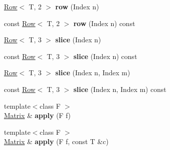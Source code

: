 \begin{DoxyCompactItemize}
\item 
\hyperlink{classcpt_1_1Row}{Row}$<$ T, 2 $>$ {\bfseries row} (Index n)\hypertarget{classcpt_1_1Matrix_3_01T_00_013_01_4_a712df7cee309914ac305c89775e1aace}{}\label{classcpt_1_1Matrix_3_01T_00_013_01_4_a712df7cee309914ac305c89775e1aace}

\item 
const \hyperlink{classcpt_1_1Row}{Row}$<$ T, 2 $>$ {\bfseries row} (Index n) const \hypertarget{classcpt_1_1Matrix_3_01T_00_013_01_4_a841489be3e3f0dd30a9de2e023f15066}{}\label{classcpt_1_1Matrix_3_01T_00_013_01_4_a841489be3e3f0dd30a9de2e023f15066}

\item 
\hyperlink{classcpt_1_1Row}{Row}$<$ T, 3 $>$ {\bfseries slice} (Index n)\hypertarget{classcpt_1_1Matrix_3_01T_00_013_01_4_aa9535bf0cdd13e25f9694271cbadf6fc}{}\label{classcpt_1_1Matrix_3_01T_00_013_01_4_aa9535bf0cdd13e25f9694271cbadf6fc}

\item 
const \hyperlink{classcpt_1_1Row}{Row}$<$ T, 3 $>$ {\bfseries slice} (Index n) const \hypertarget{classcpt_1_1Matrix_3_01T_00_013_01_4_acf91aa195e721b9b3c270eedfc7b3bb9}{}\label{classcpt_1_1Matrix_3_01T_00_013_01_4_acf91aa195e721b9b3c270eedfc7b3bb9}

\item 
\hyperlink{classcpt_1_1Row}{Row}$<$ T, 3 $>$ {\bfseries slice} (Index n, Index m)\hypertarget{classcpt_1_1Matrix_3_01T_00_013_01_4_a5ab8396dfac6abb27f1182742a00f93a}{}\label{classcpt_1_1Matrix_3_01T_00_013_01_4_a5ab8396dfac6abb27f1182742a00f93a}

\item 
const \hyperlink{classcpt_1_1Row}{Row}$<$ T, 3 $>$ {\bfseries slice} (Index n, Index m) const \hypertarget{classcpt_1_1Matrix_3_01T_00_013_01_4_ab472a06ac08af59b1b4686424232cd5d}{}\label{classcpt_1_1Matrix_3_01T_00_013_01_4_ab472a06ac08af59b1b4686424232cd5d}

\item 
{\footnotesize template$<$class F $>$ }\\\hyperlink{classcpt_1_1Matrix}{Matrix} \& {\bfseries apply} (F f)\hypertarget{classcpt_1_1Matrix_3_01T_00_013_01_4_add33cf746f6233115c6d2a2b7e55ae3a}{}\label{classcpt_1_1Matrix_3_01T_00_013_01_4_add33cf746f6233115c6d2a2b7e55ae3a}

\item 
{\footnotesize template$<$class F $>$ }\\\hyperlink{classcpt_1_1Matrix}{Matrix} \& {\bfseries apply} (F f, const T \&c)\hypertarget{classcpt_1_1Matrix_3_01T_00_013_01_4_a80dde0eb8e65518c94c4bbcdc4cb037a}{}\label{classcpt_1_1Matrix_3_01T_00_013_01_4_a80dde0eb8e65518c94c4bbcdc4cb037a}


\end{DoxyCompactItemize}
